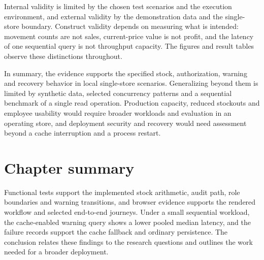 Internal validity is limited by the chosen test scenarios and the execution environment, and external validity by the demonstration data and the single-store boundary. Construct validity depends on measuring what is intended: movement counts are not sales, current-price value is not profit, and the latency of one sequential query is not throughput capacity. The figures and result tables observe these distinctions throughout.


In summary, the evidence supports the specified stock, authorization, warning and recovery behavior in local single-store scenarios. Generalizing beyond them is limited by synthetic data, selected concurrency patterns and a sequential benchmark of a single read operation. Production capacity, reduced stockouts and employee usability would require broader workloads and evaluation in an operating store, and deployment security and recovery would need assessment beyond a cache interruption and a process restart.


\FloatBarrier

\section{Chapter summary}

Functional tests support the implemented stock arithmetic, audit path, role boundaries and warning transitions, and browser evidence supports the rendered workflow and selected end-to-end journeys. Under a small sequential workload, the cache-enabled warning query shows a lower pooled median latency, and the failure records support the cache fallback and ordinary persistence. The conclusion relates these findings to the research questions and outlines the work needed for a broader deployment.
